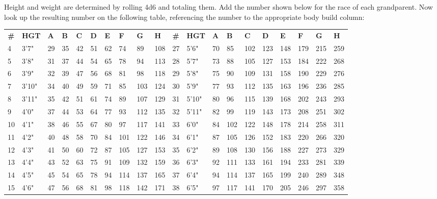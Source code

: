\normalsize
Height and weight are determined by rolling 4d6 and totaling them. Add the number shown below for the race of each grandparent. Now look up the resulting number on the following table, referencing the number to the appropriate body build column:

\begin{normbox}
\begin{tabularx}{\linewidth}{@{} X X X X X X X X X X | X X X X X X X X X X}
\small
\textbf{\#} & \textbf{HGT} & \textbf{A} & \textbf{B} & \textbf{C} & \textbf{D} & \textbf{E} & \textbf{F} & \textbf{G} & \textbf{H} & \textbf{\#} & \textbf{HGT} & \textbf{A} & \textbf{B} & \textbf{C} & \textbf{D} & \textbf{E} & \textbf{F} & \textbf{G} & \textbf{H}\\
4 & 3'7" & 29 & 35 & 42 & 51 & 62 & 74 & 89 & 108 & 27 & 5'6" & 70 & 85 & 102 & 123 & 148 & 179 & 215 & 259\\
5 & 3'8" & 31 & 37 & 44 & 54 & 65 & 78 & 94 & 113 & 28 & 5'7" & 73 & 88 & 105 & 127 & 153 & 184 & 222 & 268\\
6 & 3'9" & 32 & 39 & 47 & 56 & 68 & 81 & 98 & 118 & 29 & 5'8" & 75 & 90 & 109 & 131 & 158 & 190 & 229 & 276\\
7 & 3'10" & 34 & 40 & 49 & 59 & 71 & 85 & 103 & 124 & 30 & 5'9" & 77 & 93 & 112 & 135 & 163 & 196 & 236 & 285\\
8 & 3'11" & 35 & 42 & 51 & 61 & 74 & 89 & 107 & 129 & 31 & 5'10" & 80 & 96 & 115 & 139 & 168 & 202 & 243 & 293\\
9 & 4'0" & 37 & 44 & 53 & 64 & 77 & 93 & 112 & 135 & 32 & 5'11" & 82 & 99 & 119 & 143 & 173 & 208 & 251 & 302\\
10 & 4'1" & 38 & 46 & 55 & 67 & 80 & 97 & 117 & 141 & 33 & 6'0" & 84 & 102 & 122 & 148 & 178 & 214 & 258 & 311\\
11 & 4'2" & 40 & 48 & 58 & 70 & 84 & 101 & 122 & 146 & 34 & 6'1" & 87 & 105 & 126 & 152 & 183 & 220 & 266 & 320\\
12 & 4'3" & 41 & 50 & 60 & 72 & 87 & 105 & 127 & 153 & 35 & 6'2" & 89 & 108 & 130 & 156 & 188 & 227 & 273 & 329\\
13 & 4'4" & 43 & 52 & 63 & 75 & 91 & 109 & 132 & 159 & 36 & 6'3" & 92 & 111 & 133 & 161 & 194 & 233 & 281 & 339\\
14 & 4'5" & 45 & 54 & 65 & 78 & 94 & 114 & 137 & 165 & 37 & 6'4" & 94 & 114 & 137 & 165 & 199 & 240 & 289 & 348\\
15 & 4'6" & 47 & 56 & 68 & 81 & 98 & 118 & 142 & 171 & 38 & 6'5" & 97 & 117 & 141 & 170 & 205 & 246 & 297 & 358\\

\end{tabularx}
\end{normbox}
